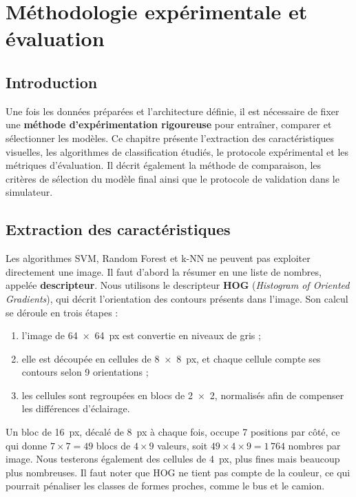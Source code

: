 \chapter{Méthodologie expérimentale et évaluation}
\label{chap:methodologie}

\section{Introduction}

Une fois les données préparées et l'architecture définie, il est nécessaire de fixer une \textbf{méthode d'expérimentation rigoureuse} pour entraîner, comparer et sélectionner les modèles. Ce chapitre présente l'extraction des caractéristiques visuelles, les algorithmes de classification étudiés, le protocole expérimental et les métriques d'évaluation. Il décrit également la méthode de comparaison, les critères de sélection du modèle final ainsi que le protocole de validation dans le simulateur.

\section{Extraction des caractéristiques}

Les algorithmes SVM, Random Forest et k-NN ne peuvent pas exploiter directement une image. Il faut d'abord la résumer en une liste de nombres, appelée \textbf{descripteur}. Nous utilisons le descripteur \textbf{HOG} (\textit{Histogram of Oriented Gradients}), qui décrit l'orientation des contours présents dans l'image. Son calcul se déroule en trois étapes :

\begin{enumerate}
  \item l'image de 64~×~64~px est convertie en niveaux de gris ;
  \item elle est découpée en cellules de 8~×~8~px, et chaque cellule compte ses contours selon 9 orientations ;
  \item les cellules sont regroupées en blocs de 2~×~2, normalisés afin de compenser les différences d'éclairage.
\end{enumerate}

Un bloc de 16~px, décalé de 8~px à chaque fois, occupe 7 positions par côté, ce qui donne $7 \times 7 = 49$ blocs de $4 \times 9$ valeurs, soit $49 \times 4 \times 9 = 1\,764$ nombres par image. Nous testerons également des cellules de 4~px, plus fines mais beaucoup plus nombreuses. Il faut noter que HOG ne tient pas compte de la couleur, ce qui pourrait pénaliser les classes de formes proches, comme le bus et le camion.

